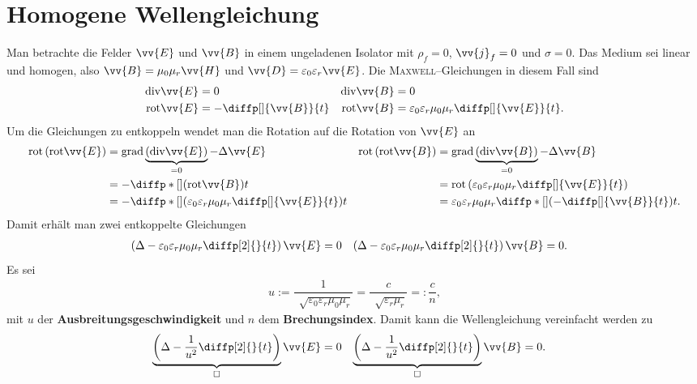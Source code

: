 \documentclass[a4paper,12pt]{article}
\numberwithin{equation}{section}
\begin{document}
\newpage
\section{Homogene Wellengleichung}
Man betrachte die Felder $\vv{E}$ und $\vv{B}$ in einem ungeladenen Isolator mit $\rho _f=0$, $\vv{j}_f=0$ und $\sigma =0$.
Das Medium sei linear und homogen, also $\vv{B}=\mu _0\mu _r\vv{H}$ und $\vv{D}=\varepsilon _0\varepsilon _r\vv{E}$.
Die \textsc{Maxwell}--Gleichungen in diesem Fall sind
\begin{align} 
        \text{div}\vv{E}&=0&\text{div}\vv{B}&=0\\
        \text{rot}\vv{E}&=-\diffp[]{\vv{B}}{t}&\text{rot}\vv{B}&=\varepsilon _0\varepsilon _r\mu _0\mu _r\diffp[]{\vv{E}}{t}
.\end{align} 
Um die Gleichungen zu entkoppeln wendet man die Rotation auf die Rotation von $\vv{E}$ an
\begin{align} 
        \text{rot}\left(\text{rot}\vv{E}\right)&=\text{grad}\underbrace{\left(\text{div}\vv{E}\right)}_{=0}-\Delta \vv{E}&\text{rot}\left(\text{rot}\vv{B}\right)&=\text{grad}\underbrace{\left(\text{div}\vv{B}\right)}_{=0}-\Delta \vv{B}\\
                                               &=-\diffp*[]{\left(\text{rot}\vv{B}\right)}{t}&&=\text{rot}\left(\varepsilon _0\varepsilon _r\mu _0\mu _r\diffp[]{\vv{E}}{t}\right)\\
                                               &=-\diffp*[]{\left(\varepsilon _0\varepsilon _r\mu _0\mu _r\diffp[]{\vv{E}}{t}\right)}{t}&&=\varepsilon _0\varepsilon _r\mu _0\mu _r\diffp*[]{\left(-\diffp[]{\vv{B}}{t}\right)}{t}
.\end{align} 
Damit erhält man zwei entkoppelte Gleichungen
\begin{align} 
        \left(\Delta -\varepsilon _0\varepsilon _r\mu _0\mu _r\diffp[2]{}{t}\right)\vv{E}&=0&\left(\Delta -\varepsilon _0\varepsilon _r\mu _0\mu _r\diffp[2]{}{t}\right)\vv{B}&=0
.\end{align} 
Es sei 
\begin{align} 
        u:=\dfrac{1}{\,\sqrt[]{\varepsilon _0\varepsilon _r\mu _0\mu _r}}=\dfrac{c}{\,\sqrt[]{\varepsilon _r\mu _r}}=:\dfrac{c}{n}
,\end{align} 
mit $u$ der \textbf{Ausbreitungsgeschwindigkeit} und $n$ dem \textbf{Brechungsindex}.
Damit kann die Wellengleichung vereinfacht werden zu
\begin{align} 
        \underbrace{\left(\Delta -\dfrac{1}{u^2}\diffp[2]{}{t}\right)}_{\Box}\vv{E}&=0&\underbrace{\left(\Delta -\dfrac{1}{u^2}\diffp[2]{}{t}\right)}_{\Box}\vv{B}&=0
.\end{align} 
\end{document}
